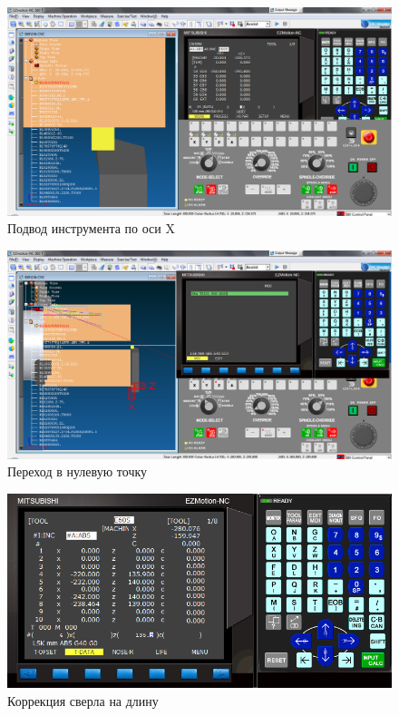 \begin{figure}[ht]
\centering
	\includegraphics[scale=0.45]{4.png}
    \caption{Подвод инструмента по оси X\label{fig:x}}
\end{figure}

\begin{figure}[ht]
\centering
	\includegraphics[scale=0.45]{5.png}
    \caption{Переход в нулевую точку\label{fig:goto}}
\end{figure}

\begin{figure}[ht]
\centering
	\includegraphics[scale=0.8]{6.png}
    \caption{Коррекция сверла на длину\label{fig:length}}
\end{figure}

